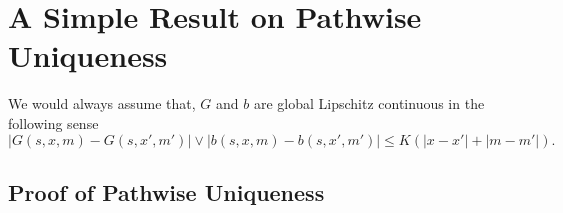 \documentclass[8pt,onesided]{article}
\begin{document}
\section{A Simple Result on Pathwise Uniqueness}

\begin{ass}
 We would always assume that, $G$ and $b$ are global Lipschitz continuous in the following sense
\begin{equation*}
    |G(s,x,m)-G(s,x',m')|\vee  |b(s,x,m)-b(s,x',m')|\le K(|x-x'|+|m-m'|).
\end{equation*}
\end{ass}

\subsection{Proof of Pathwise Uniqueness}
\end{document}
